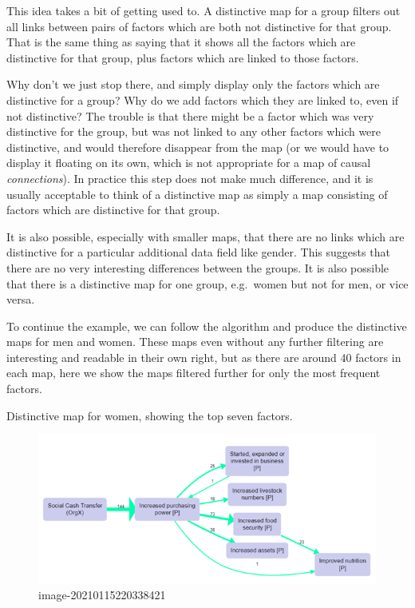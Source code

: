 \documentclass[
]{book}
\begin{document}
This idea takes a bit of getting used to. A distinctive map for a group filters out all links between pairs of factors which are both not distinctive for that group. That is the same thing as saying that it shows all the factors which are distinctive for that group, plus factors which are linked to those factors.

Why don't we just stop there, and simply display only the factors which are distinctive for a group? Why do we add factors which they are linked to, even if not distinctive? The trouble is that there might be a factor which was very distinctive for the group, but was not linked to any other factors which were distinctive, and would therefore disappear from the map (or we would have to display it floating on its own, which is not appropriate for a map of causal \emph{connections}). In practice this step does not make much difference, and it is usually acceptable to think of a distinctive map as simply a map consisting of factors which are distinctive for that group.

It is also possible, especially with smaller maps, that there are no links which are distinctive for a particular additional data field like gender. This suggests that there are no very interesting differences between the groups. It is also possible that there is a distinctive map for one group, e.g.~women but not for men, or vice versa.

To continue the example, we can follow the algorithm and produce the distinctive maps for men and women. These maps even without any further filtering are interesting and readable in their own right, but as there are around 40 factors in each map, here we show the maps filtered further for only the most frequent factors.

Distinctive map for women, showing the top seven factors.

\begin{figure}
\centering
\includegraphics{_assets/image-20210115220338421.png}
\caption{image-20210115220338421}
\end{figure}
\end{document}
